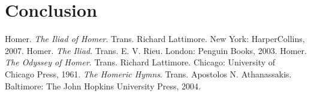 \documentclass[11pt]{article}
\begin{document}
\section{Conclusion}


\newpage

\begin{thebibliography}{9}
        Homer. \emph{The Iliad of Homer}. Trans. Richard Lattimore. New York: HarperCollins, 2007.
		Homer. \emph{The Iliad}. Trans. E. V. Rieu. London: Penguin Books, 2003.
        Homer. \emph{The Odyssey of Homer}. Trans. Richard Lattimore. Chicago: University of Chicago Press, 1961.
        \emph{The Homeric Hymns}. Trans. Apostolos N. Athanassakis. Baltimore: The John Hopkins University Press, 2004.
\end{thebibliography}
\end{document}

